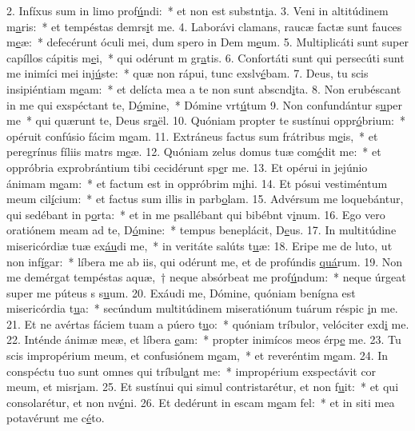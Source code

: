2. Infíxus sum in limo prof\uline{ú}ndi:~* et non est substnt\uline{i}a.
3. Veni in altitúdinem m\uline{a}ris:~* et tempéstas demrs\uline{i}t me.
4. Laborávi clamans, raucæ factæ sunt fauces m\uline{e}æ:~* defecérunt óculi mei, dum spero in Dem m\uline{e}um.
5. Multiplicáti sunt super capíllos cápitis m\uline{e}i,~* qui odérunt m gr\uline{a}tis.
6. Confortáti sunt qui persecúti sunt me inimíci mei inj\uline{ú}ste:~* quæ non rápui, tunc exslv\uline{é}bam.
7. Deus, tu scis insipiéntiam m\uline{e}am:~* et delícta mea a te non sunt abscnd\uline{i}ta.
8. Non erubéscant in me qui exspéctant te, D\uline{ó}mine,~* Dómine vrt\uline{ú}tum
9. Non confundántur s\uline{u}per me~* qui quærunt te, Deus sr\uline{a}ël.
10. Quóniam propter te sustínui oppr\uline{ó}brium:~* opéruit confúsio fácim m\uline{e}am.
11. Extráneus factus sum frátribus m\uline{e}is,~* et peregrínus fíliis matrs m\uline{e}æ.
12. Quóniam zelus domus tuæ com\uline{é}dit me:~* et oppróbria exprobrántium tibi cecidérunt sp\uline{e}r me.
13. Et opérui in jejúnio ánimam m\uline{e}am:~* et factum est in oppróbrim m\uline{i}hi.
14. Et pósui vestiméntum meum cil\uline{í}cium:~* et factus sum illis in parb\uline{o}lam.
15. Advérsum me loquebántur, qui sedébant in p\uline{o}rta:~* et in me psallébant qui bibébnt v\uline{i}num.
16. Ego vero oratiónem meam ad te, D\uline{ó}mine:~* tempus beneplácit, D\uline{e}us.
17. In multitúdine misericórdiæ tuæ ex\uline{áu}di me,~* in veritáte salúts t\uline{u}æ:
18. Eripe me de luto, ut non inf\uline{í}gar:~* líbera me ab iis, qui odérunt me, et de profúndis \uline{quá}rum.
19. Non me demérgat tempéstas aquæ,~† neque absórbeat me prof\uline{ú}ndum:~* neque úrgeat super me púteus s s\uline{u}um.
20. Exáudi me, Dómine, quóniam benígna est misericórdia t\uline{u}a:~* secúndum multitúdinem miseratiónum tuárum réspic \uline{i}n me.
21. Et ne avértas fáciem tuam a púero t\uline{u}o:~* quóniam tríbulor, velóciter exd\uline{i} me.
22. Inténde ánimæ meæ, et líbera \uline{e}am:~* propter inimícos meos érp\uline{e} me.
23. Tu scis impropérium meum, et confusiónem m\uline{e}am,~* et reveréntim m\uline{e}am.
24. In conspéctu tuo sunt omnes qui tríbul\uline{a}nt me:~* impropérium exspectávit cor meum, et misr\uline{i}am.
25. Et sustínui qui simul contristarétur, et non f\uline{u}it:~* et qui consolarétur, et non nv\uline{é}ni.
26. Et dedérunt in escam m\uline{e}am fel:~* et in siti mea potavérunt me c\uline{é}to.
